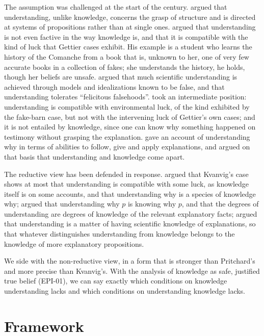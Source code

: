 \documentclass{situationist-preprint}
\begin{document}
The assumption was challenged at the start of the century. \citet{Zagzebski2001} argued that understanding, unlike knowledge, concerns the grasp of structure and is directed at systems of propositions rather than at single ones. \citet{Kvanvig2003} argued that understanding is not even factive in the way knowledge is, and that it is compatible with the kind of luck that Gettier cases exhibit. His example is a student who learns the history of the Comanche from a book that is, unknown to her, one of very few accurate books in a collection of fakes; she understands the history, he holds, though her beliefs are unsafe. \citet{Elgin2007,Elgin2017} argued that much scientific understanding is achieved through models and idealizations known to be false, and that understanding tolerates \enquote{felicitous falsehoods}. \citet{Pritchard2010} took an intermediate position: understanding is compatible with environmental luck, of the kind exhibited by the fake-barn case, but not with the intervening luck of Gettier's own cases; and it is not entailed by knowledge, since one can know why something happened on testimony without grasping the explanation. \citet{Hills2016} gave an account of understanding why in terms of abilities to follow, give and apply explanations, and argued on that basis that understanding and knowledge come apart.

The reductive view has been defended in response. \citet{Grimm2006} argued that Kvanvig's case shows at most that understanding is compatible with some luck, as knowledge itself is on some accounts, and that understanding why is a species of knowledge why; \citet{Sliwa2015} argued that understanding why $p$ is knowing why $p$, and that the degrees of understanding are degrees of knowledge of the relevant explanatory facts; \citet{Khalifa2017} argued that understanding is a matter of having scientific knowledge of explanations, so that whatever distinguishes understanding from knowledge belongs to the knowledge of more explanatory propositions.

We side with the non-reductive view, in a form that is stronger than Pritchard's and more precise than Kvanvig's. With the analysis of knowledge as safe, justified true belief (EPI-01), we can say exactly which conditions on knowledge understanding lacks and which conditions on understanding knowledge lacks.

\section{Framework}
\end{document}

